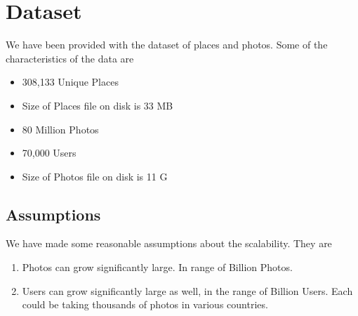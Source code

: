 \chapter{Dataset}

	We have been provided with the dataset of places and photos. Some of the characteristics of the data are
	\begin{itemize}
	\item 308,133 Unique Places
	\item Size of Places file on disk is 33 MB 
	\item 80 Million Photos
	\item 70,000 Users
	\item Size of Photos file on disk is 11 G
	\end{itemize}
	
\section{Assumptions}
	
	We have made some reasonable assumptions about the scalability. They are
	\begin{enumerate}
	\item Photos can grow significantly large. In range of Billion Photos.
	\item Users can grow significantly large as well, in the range of Billion Users. Each could be taking thousands of photos in various countries.  
	\end{enumerate}

	
